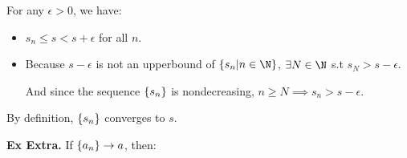 \begin{enumerate}[label=(\roman*)]
\begin{itemize}
        For any $\epsilon > 0$, we have:
        \begin{itemize}[label=+)]
            \item $s_n \leq s < s + \epsilon$ for all $n$.
            \item Because $s - \epsilon$ is not an upperbound of $\seq{s_n | n\in\N}$, $\exists N\in\N$ s.t $s_N > s-\epsilon$.
            
            And since the sequence $\left\{s_n\right\}$ is nondecreasing, $n\geq N \implies s_n > s-\epsilon$.
        \end{itemize}
        By definition, $\left\{s_n\right\}$ converges to $s$.
    \end{itemize}
\end{enumerate}

\noindent {} \textbf{Ex Extra.} \label{ex:1.5.extra}
If $\left\{a_n\right\}\to a$, then:
